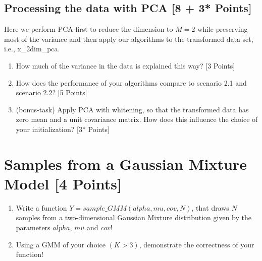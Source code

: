 \documentclass[a4paper]{article}
\begin{document}
\subsection{Processing the data with PCA [8 + 3* Points]}
Here we perform PCA first to reduce the dimension to $M = 2$ while preserving most of the variance and then apply our algorithms to the transformed data set, i.e., x\_2dim\_pca.
\begin{enumerate}
  \item How much of the variance in the data is explained this way? [3 Points]
  \item How does the performance of your algorithms compare to scenario 2.1 and scenario 2.2? [5 Points]
  \item (bonus-task) Apply PCA with whitening, so that the transformed data has zero mean and a unit covariance matrix. How does this influence the choice of your initialization? [3* Points]
\end{enumerate}

\section*{Samples from a Gaussian Mixture Model [4 Points]}
\begin{enumerate}
  \item Write a function $Y = sample\_GMM(alpha, mu, cov, N)$, that draws $N$ samples from a two-dimensional Gaussian Mixture distribution given by the parameters $alpha$, $mu$ and $cov$!
  \item Using a GMM of your choice $(K > 3)$, demonstrate the correctness of your function!
\end{enumerate}
\end{document}
